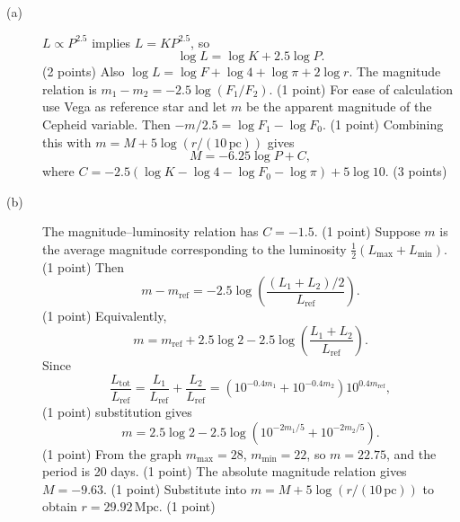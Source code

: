 \begin{description}
\item[(a)] $L\propto P^{2.5}$ implies $L=KP^{2.5}$, so
\[\log L=\log K+2.5\log P.\]
\hfill(2 points)
Also $\log L=\log F+\log4+\log\pi+2\log r$.
The magnitude relation is $m_1-m_2=-2.5\log(F_1/F_2)$. \hfill(1 point)
For ease of calculation use Vega as reference star and let $m$ be the apparent magnitude of the Cepheid variable. Then $-m/2.5=\log F_1-\log F_0$. \hfill(1 point)
Combining this with $m=M+5\log(r/(10\,\mathrm{pc}))$ gives
\[M=-6.25\log P+C,\]
where $C=-2.5(\log K-\log4-\log F_0-\log\pi)+5\log10$. \hfill(3 points)
\item[(b)] The magnitude--luminosity relation has $C=-1.5$. \hfill(1 point)
Suppose $m$ is the average magnitude corresponding to the luminosity $\tfrac12(L_{\max}+L_{\min})$. \hfill(1 point)
Then
\[m-m_{\mathrm{ref}}=-2.5\log\left(\frac{(L_1+L_2)/2}{L_{\mathrm{ref}}}\right).\]
\hfill(1 point)
Equivalently,
\[m=m_{\mathrm{ref}}+2.5\log2-2.5\log\left(\frac{L_1+L_2}{L_{\mathrm{ref}}}\right).\]
Since
\[\frac{L_{\mathrm{tot}}}{L_{\mathrm{ref}}}=\frac{L_1}{L_{\mathrm{ref}}}+\frac{L_2}{L_{\mathrm{ref}}}=(10^{-0.4m_1}+10^{-0.4m_2})10^{0.4m_{\mathrm{ref}}},\]
\hfill(1 point)
substitution gives
\[m=2.5\log2-2.5\log(10^{-2m_1/5}+10^{-2m_2/5}).\]
\hfill(1 point)
From the graph $m_{\max}=28$, $m_{\min}=22$, so $m=22.75$, and the period is 20 days. \hfill(1 point)
The absolute magnitude relation gives $M=-9.63$. \hfill(1 point)
Substitute into $m=M+5\log(r/(10\,\mathrm{pc}))$ to obtain $r=29.92\,\mathrm{Mpc}$. \hfill(1 point)
\end{description}
